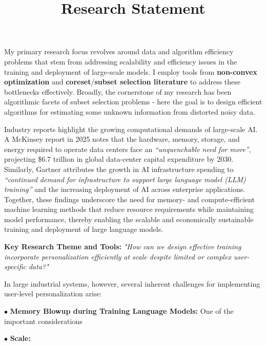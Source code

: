 \documentclass[11pt,a4paper,sans,usenames,dvipsnames]{moderncv} %
\title{Research Statement}
\begin{document}
\makecvtitle
My primary research focus revolves around data and algorithm efficiency problems that stem from addressing scalability and efficiency issues in the training and deployment of large-scale models. I employ tools from \textbf{non-convex optimization} and \textbf{coreset}/\textbf{subset selection literature} to address these bottlenecks effectively.
Broadly, the cornerstone of my research has been algorithmic facets of subset selection problems - here the goal is to design efficient algorithms for estimating some unknown information from distorted noisy data.

Industry reports highlight the growing computational demands of large-scale AI. A McKinsey report in 2025 \cite{mckinsey2025} notes that the hardware, memory, storage, and energy required to operate data centers face an \emph{``unquenchable need for more''}, projecting \$6.7 trillion in global data-center capital expenditure by 2030. Similarly, Gartner \cite{gartner2026} attributes the growth in AI infrastructure spending to \emph{``continued demand for infrastructure to support large language model (LLM) training''} and the increasing deployment of AI across enterprise applications. Together, these findings underscore the need for memory- and compute-efficient machine learning methods that reduce resource requirements while maintaining model performance, thereby enabling the scalable and economically sustainable training and deployment of large language models.

\textbf{Key Research Theme and Tools:}
\noindent \textit{"How can we design effective training incorporate personalization efficiently at scale despite limited or complex user-specific data?"}

In large industrial systems, however, several inherent challenges for implementing user-level personalization arise:

$\bullet{}$ \textbf{Memory Blowup during Training Language Models:} One of the important considerations


$\bullet{}$ \textbf{Scale:}
\end{document}
